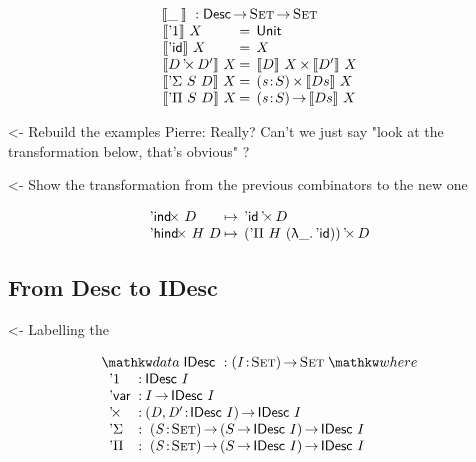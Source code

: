 \documentclass[preprint, authoryear]{sigplanconf}
\newenvironment{structure}{\footnotesize\verbatim}{\endverbatim}
\begin{document}
\[\stk{
\:\:\descop{\_\:}{} : \Desc \To \Set \To \Set \\
\begin{array}{l@{\:=\:\:}ll}
\descop{\DUnit}{X}        &  \Unit                                       \\
\descop{\DId}{X}          &  X                                           \\
\descop{\DProd{D}{D'}}{X} &  \TIMES{\descop{D}{X}}{\descop{D'}{X}}       \\
\descop{\DSigma{S}{D}}{X} &  \SIGMA{\V{s}}{S} \descop{D s}{X}                \\
\descop{\DPi{S}{D}}{X}    &  \PI{\V{s}}{S} \descop{D s}{X}            
\end{array}
}\]

\begin{structure}
<- Rebuild the examples
Pierre: Really? Can't we just say "look at the transformation below, that's obvious" ?
\end{structure}

\begin{structure}
<- Show the transformation from the previous combinators to the new one
\end{structure}

\[\begin{array}{l@{\:\mapsto\:\:}l}
\DIndx{D}         & \DProd{\DId}{D}                      \\
\DHindx{H}{D}     & \DProd{(\DPi{H}{(\LAM{\_} \DId)})}{D}
\end{array}
\]


\subsection{From Desc to IDesc}

\begin{structure}
<- Labelling the \DId
\end{structure}

\[
\stk{
\data \IDesc{} : \PI{\V{I}}{\Set}{\Set} \where \\
\;\;\begin{array}{@{}l@{\::\:}l@{\quad}l}
    \DUnit          & \IDesc{I}                                         \\
    \DVar           & I \To \IDesc{I}                                   \\
    \DProd{}{}      & \PI{\V{D}, \V{D'}}{\IDesc{I}} \IDesc{I}           \\
    \DSigma         & \PI{\V{S}}{\Set} \PIS{S \To \IDesc{I}} \IDesc{I}  \\
    \DPi            & \PI{\V{S}}{\Set} \PIS{S \To \IDesc{I}} \IDesc{I} 
\end{array}
}
\]
\end{document}

